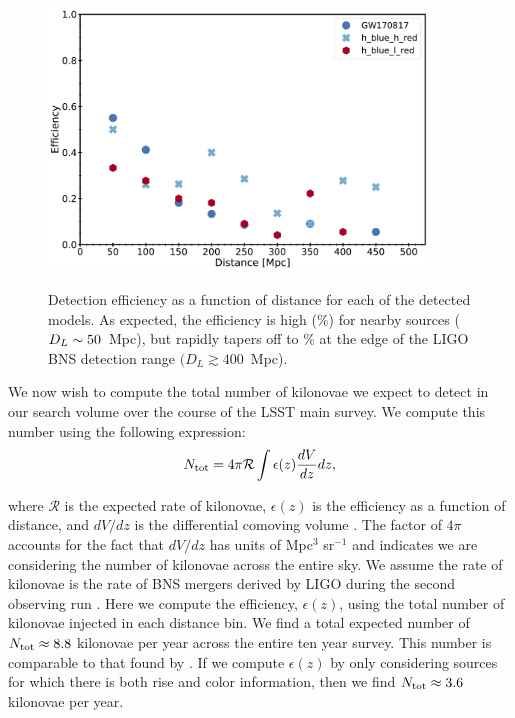 \begin{figure}[!t]
\begin{center}
\hspace*{-0.1in}
\scalebox{1.}
{\includegraphics[width=0.9\textwidth]{./figs/chapter6/f3.pdf}}
\caption{\singlespace Detection efficiency as a function of distance for each of the detected models. As expected, the efficiency is high (\%) for nearby sources ($D_L \sim50$~Mpc), but rapidly tapers off to \% at the edge of the LIGO BNS detection range $(D_L \gtrsim 400$~Mpc).}
\label{fig:ch6_dist_eff}
\end{center}
\end{figure}

We now wish to compute the total number of kilonovae we expect to detect in our search volume over the course of the LSST main survey. We compute this number using the following expression:
\begin{equation}
N_{\rm tot} = 4 \pi \mathcal{R} \int \epsilon (z) \frac{dV}{dz} dz,
\end{equation}

\noindent where $\mathcal{R}$ is the expected rate of kilonovae, $\epsilon (z)$ is the efficiency as a function of distance, and $dV/dz$ is the differential comoving volume \citep[see e.g.,][]{Hogg1999}. The factor of $4\pi$ accounts for the fact that $dV/dz$ has units of Mpc$^{3}$ sr$^{-1}$ and indicates we are considering the number of kilonovae across the entire sky. We assume the rate of kilonovae is the rate of BNS mergers derived by LIGO during the second observing run \citep[$\mathcal{R} \apx1500$~Mpc$^{-3}$~yr$^{-1}$,][]{LIGOGW170817}. Here we compute the efficiency, $\epsilon (z)$, using the total number of kilonovae injected in each distance bin. We find a total expected number of $N_{\rm tot} \approx 8.8$ kilonovae per year across the entire ten year survey. This number is comparable to that found by \citet{Scolnic+18}. If we compute $\epsilon (z)$ by only considering sources for which there is both rise and color information, then we find $N_{\rm tot} \approx 3.6$ kilonovae per year.


